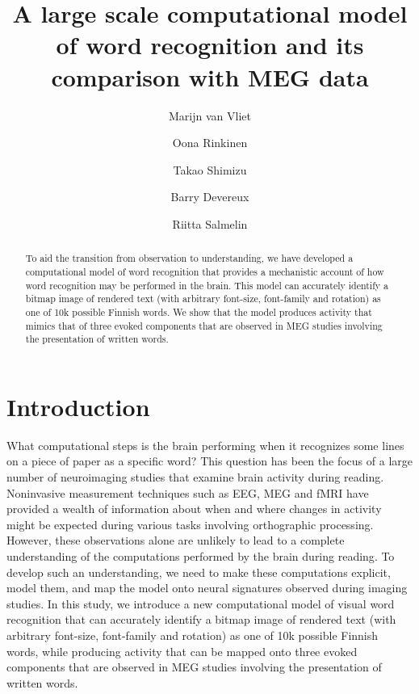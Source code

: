 \documentclass[a4paper, 10pt]{vanvliet_paper}
\title{A large scale computational model of word recognition and its comparison with MEG data}
\author[1*]{Marijn van Vliet}
\author[1]{Oona Rinkinen}
\author[1]{Takao Shimizu}
\author[2]{Barry Devereux}
\author[1]{Riitta Salmelin}
\affil[1]{Department of Neuroscience and Biomedical Engineering, Aalto University}
\affil[2]{School of Electronics, Electrical Engineering and Computer Science, Queen's University Belfast}
\affil[*]{Corresponding author: marijn.vanvliet@aalto.fi}
\begin{document}
\maketitle

\begin{abstract}
To aid the transition from observation to understanding, we have developed a computational model of word recognition that provides a mechanistic account of how word recognition may be performed in the brain.
This model can accurately identify a bitmap image of rendered text (with arbitrary font-size, font-family and rotation) as one of 10k possible Finnish words.
We show that the model produces activity that mimics that of three evoked components that are observed in \gls{MEG} studies involving the presentation of written words.
\end{abstract}

\section{Introduction}

What computational steps is the brain performing when it recognizes some lines on a piece of paper as a specific word?
This question has been the focus of a large number of neuroimaging studies that examine brain activity during reading.
Noninvasive measurement techniques such as \gls{EEG}\cite{Grainger2009}, \gls{MEG}\cite{Salmelin2007} and \gls{fMRI}\cite{Price2012} have provided a wealth of information about when and where changes in activity might be expected during various tasks involving orthographic processing\cite{Carreiras2014}.
However, these observations alone are unlikely to lead to a complete understanding of the computations performed by the brain during reading\cite{Poeppel2012}.
To develop such an understanding, we need to make these computations explicit, model them, and map the model onto neural signatures observed during imaging studies\cite{Barber2007, Price2018}.
In this study, we introduce a new computational model of visual word recognition that can accurately identify a bitmap image of rendered text (with arbitrary font-size, font-family and rotation) as one of 10k possible Finnish words, while producing activity that can be mapped onto three evoked components that are observed in \gls{MEG} studies involving the presentation of written words.
\end{document}
